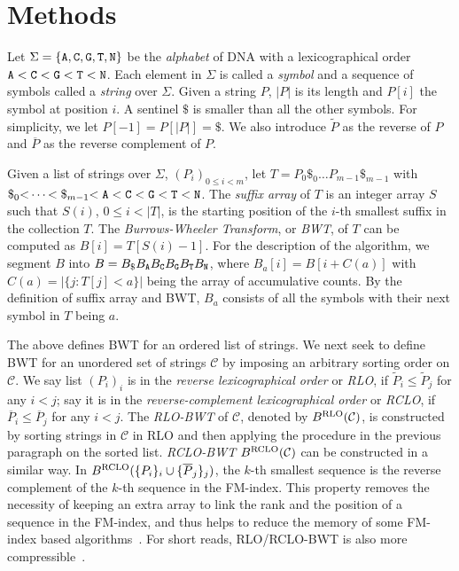 \documentclass{bioinfo}
\begin{document}
\section{Methods}
\begin{methods}
Let $\Sigma=\{{\tt A},{\tt C},{\tt G},{\tt T},{\tt N}\}$ be the \emph{alphabet}
of DNA with a lexicographical order
${\tt A\char60C\char60G\char60T\char60N}$. Each element in $\Sigma$ is
called a \emph{symbol} and a sequence of symbols called a \emph{string} over
$\Sigma$. Given a string $P$, $|P|$ is its length and $P[i]$ the symbol at
position $i$. A sentinel $\$$ is smaller than all the other symbols. For
simplicity, we let $P[-1]=P[|P|]=\$$. We also introduce
$\widetilde{P}$ as the reverse of $P$ and $\overline{P}$ as the reverse
complement of $P$.

Given a list of strings over $\Sigma$, $(P_i)_{0\le i<m}$, let
$T=P_0\$_0\ldots P_{m-1}\$_{m-1}$ with
${\tt\char36}_0{\tt\char60}\cdots{\char60\tt\char36}_{m-1}{\tt\char60A\char60C\char60G\char60T\char60N}$.
The \emph{suffix array} of $T$ is an integer array $S$ such that $S(i)$,
\mbox{$0\le i<|T|$}, is the starting position of the $i$-th smallest suffix in
the collection $T$. The \emph{Burrows-Wheeler Transform}, or \emph{BWT}, of $T$
can be computed as \mbox{$B[i]=T[S(i)-1]$}. For the description of the
algorithm, we segment $B$ into \mbox{$B=B_{\tt\$}B_{\tt A}B_{\tt C}B_{\tt
G}B_{\tt T}B_{\tt N}$}, where \mbox{$B_a[i]=B[i+C(a)]$} with
\mbox{$C(a)=|\{j:T[j]<a\}|$} being the array of accumulative counts. By the
definition of suffix array and BWT, $B_a$ consists of all the symbols with
their next symbol in $T$ being $a$.

The above defines BWT for an ordered list of strings. We next seek to define BWT
for an unordered set of strings $\mathcal{C}$ by imposing an arbitrary sorting
order on $\mathcal{C}$.  We say list $(P_i)_i$ is in the \emph{reverse
lexicographical order} or \emph{RLO}, if $\widetilde{P}_i\le\widetilde{P}_j$
for any $i<j$; say it is in the \emph{reverse-complement lexicographical order}
or \emph{RCLO}, if $\overline{P}_i\le\overline{P}_j$ for any $i<j$.
The \emph{RLO-BWT} of $\mathcal{C}$, denoted by $B^{\rm RLO}(\mathcal{C})$,
is constructed by sorting strings in $\mathcal{C}$ in RLO and then applying
the procedure in the previous paragraph on the sorted list. \emph{RCLO-BWT}
$B^{\rm RCLO}(\mathcal{C})$ can be constructed in a similar way. In
$B^{\rm RCLO}(\{P_i\}_i\cup\{\overline{P}_j\}_j)$, the $k$-th smallest
sequence is the reverse complement of the $k$-th sequence in the FM-index. This
property removes the necessity of keeping an extra array to link the rank and
the position of a sequence in the FM-index, and thus helps to reduce the memory
of some FM-index based algorithms~\citep{Simpson:2012aa}. For short reads, RLO/RCLO-BWT
is also more compressible~\citep{Cox:2012ly}.


\end{methods}
\end{document}

